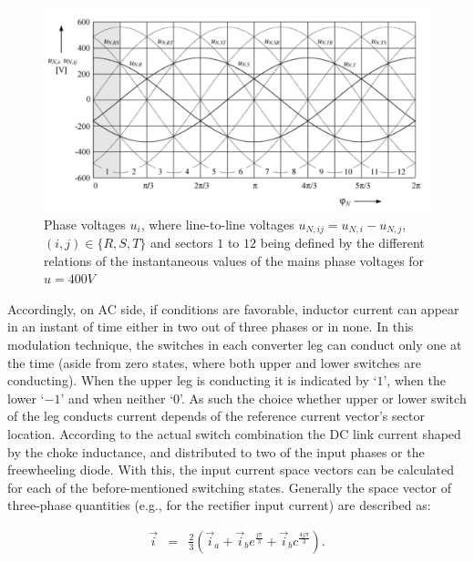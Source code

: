 \begin{figure}[!ht]
        \centering
        \includegraphics[width=\textwidth]{EMPC_PNG_Pics/Waves.png}
        \caption{Phase voltages $u_{i}$, where line-to-line voltages $u_{N,ij}=u_{N,i}-u_{N,j}$, $(i,j)\in\{R,S,T\}$ and sectors $1$ to $12$ being defined by the different relations of the instantaneous values of the mains phase voltages for $u = 400 V$}
        \label{BASICCSR:fig:waves}
    \end{figure}
		
		Accordingly, on AC side, if conditions are favorable, inductor current can appear in an instant of time either in two out
of three phases or in none. In this modulation technique, the switches in each converter leg can conduct only one at the time (aside from zero states, where both upper and lower switches are conducting). When the upper leg is conducting it is indicated by `$1$', when the lower  `$-1$' and when neither `$0$'. As such the choice whether upper or lower switch of the leg conducts current depends of the reference current vector's sector location. 
According to the actual switch combination the DC link current shaped by the choke inductance, and distributed to two of the input phases or the freewheeling diode. With this, the input current space vectors can be calculated for each of the before-mentioned switching states. Generally the space vector of three-phase quantities (e.g., for the rectifier input current) are described as:

\begin{equation}
        \begin{array}{rcl}
            \vec{i}&=&\frac{2}{3}\left(\vec{i}_a+\vec{i}_be^{\frac{j\pi}{3}}+\vec{i}_bc^{\frac{4j\pi}{3}}\right).\\
        \end{array}
        \label{BASICCSR:eqn:currents}
    \end{equation}
		
